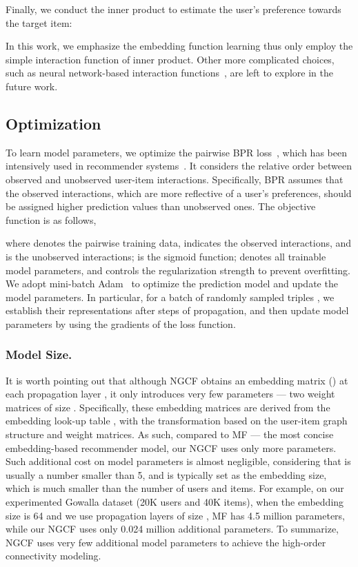 \documentclass[sigconf]{acmart}
\theoremstyle{definition}
\begin{document}
Finally, we conduct the inner product to estimate the user's preference towards the target item:

In this work, we emphasize the embedding function learning thus only employ the simple interaction function of inner product. Other more complicated choices, such as neural network-based interaction functions~\cite{NCF}, are left to explore in the future work. 


\subsection{Optimization}
To learn model parameters, we optimize the pairwise BPR loss~\cite{BPRMF}, which has been intensively used in recommender systems~\cite{ACF,APR}. It considers the relative order between observed and unobserved user-item interactions.
Specifically, BPR assumes that the observed interactions, which are more reflective of a user's preferences, should be assigned higher prediction values than unobserved ones.
The objective function is as follows,

where  denotes the pairwise training data,  indicates the observed interactions, and  is the unobserved interactions;
 is the sigmoid function;
 denotes all trainable model parameters, and  controls the  regularization strength to prevent overfitting. We adopt mini-batch Adam~\cite{Adam} to optimize the prediction model and update the model parameters.
In particular, for a batch of randomly sampled triples , we establish their representations  after  steps of propagation, and then update model parameters by using the gradients of the loss function.

\subsubsection{\textbf{Model Size.}} It is worth pointing out that although NGCF obtains an embedding matrix () at each propagation layer , it only introduces very few parameters --- two weight matrices of size . Specifically, these embedding matrices are derived from the embedding look-up table , with the transformation based on the user-item graph structure and weight matrices. 
As such, compared to MF --- the most concise embedding-based recommender model, our NGCF uses only  more parameters. 
Such additional cost on model parameters is almost negligible, considering that  is usually a number smaller than 5, and  is typically set as the embedding size, which is much smaller than the number of users and items. For example, on our experimented Gowalla dataset (20K users and 40K items), when the embedding size is 64 and we use  propagation layers of size , MF has 4.5 million parameters, while our NGCF uses only 0.024 million additional parameters. To summarize, NGCF uses very few additional model parameters to achieve the high-order connectivity modeling. 
\end{document}

